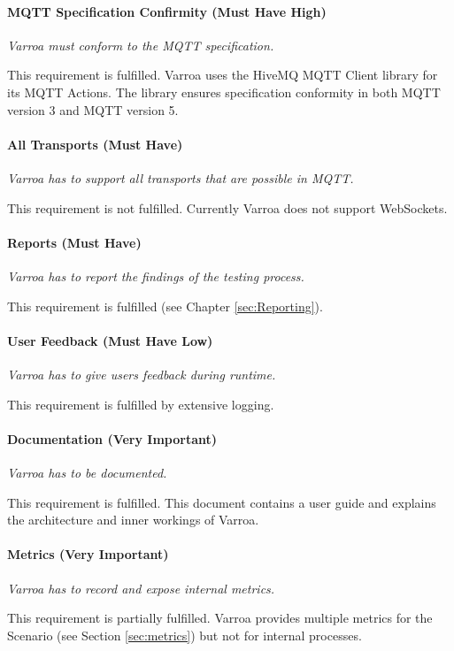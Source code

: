 \paragraph{MQTT Specification Confirmity (Must Have High)}
\emph{Varroa must conform to the MQTT specification.}

This requirement is fulfilled.
Varroa uses the HiveMQ MQTT Client library for its MQTT Actions.
The library ensures specification conformity in both MQTT version 3 and MQTT version 5.

\paragraph{All Transports (Must Have)}
\emph{Varroa has to support all transports that are possible in MQTT.}

This requirement is not fulfilled.
Currently Varroa does not support WebSockets.

\paragraph{Reports (Must Have)}
\emph{Varroa has to report the findings of the testing process.}

This requirement is fulfilled (see Chapter \ref{sec:Reporting}).

\paragraph{User Feedback (Must Have Low)}
\emph{Varroa has to give users feedback during runtime.}

This requirement is fulfilled by extensive logging.

\paragraph{Documentation (Very Important)}
\emph{Varroa has to be documented. }

This requirement is fulfilled.
This document contains a user guide and explains the architecture and inner workings of Varroa.

\paragraph{Metrics (Very Important)}
\emph{Varroa has to record and expose internal metrics.}

This requirement is partially fulfilled.
Varroa provides multiple metrics for the Scenario (see Section \ref{sec:metrics}) but not for internal processes.

